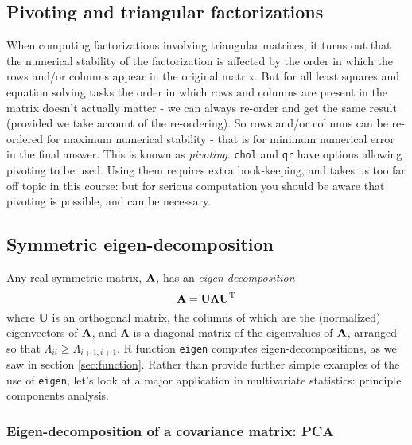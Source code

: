 \documentclass[10pt] {article}
\newcommand{\ts}{^{\rm T}}
\theoremstyle{definition}
\begin{document}
\subsection{Pivoting and triangular factorizations}
 
When computing factorizations involving triangular matrices, it turns out that the numerical stability of the factorization is affected by the order in which the rows and/or columns appear in the original matrix. But for all least squares and equation solving tasks the order in which rows and columns are present in the matrix doesn't actually matter - we can always re-order and get the same result (provided we take account of the re-ordering). So rows and/or columns can be re-ordered for maximum numerical stability - that is for minimum numerical error in the final answer. This is known as {\em pivoting}. {\tt chol} and {\tt qr} have options allowing pivoting to be used. Using them requires extra book-keeping, and takes us too far off topic in this course: but for serious computation you should be aware that pivoting is possible, and can be necessary.     
 
\subsection{Symmetric eigen-decomposition}

Any real symmetric matrix, $\bf A$, has an {\em eigen-decomposition} 
$$
{\bf A} = {\bf U}\bm{\Lambda}{\bf U}\ts
$$
where {\bf U} is an orthogonal matrix, the columns of which are the (normalized) eigenvectors of $\bf A$, and $\bm \Lambda$ is a diagonal matrix of the eigenvalues of $\bf A$, arranged so that $\Lambda_{ii}\ge\Lambda_{i+1,i+1}$. R function {\tt eigen} computes eigen-decompositions, as we saw in section \ref{sec:function}. Rather than provide further simple examples of the use of {\tt eigen}, let's look at a major application in multivariate statistics: principle components analysis. 

\subsubsection{Eigen-decomposition of a covariance matrix: PCA \label{sec:pca}}
\end{document}
